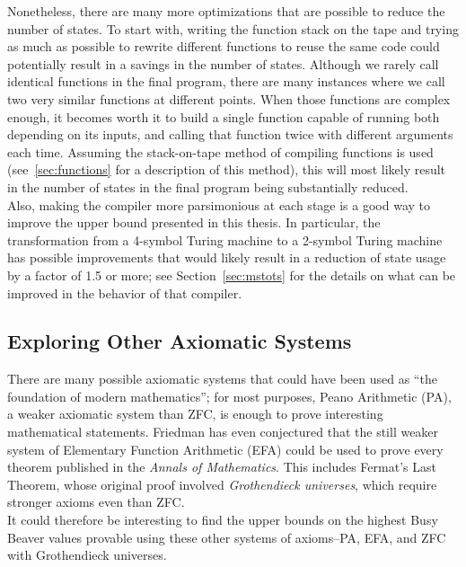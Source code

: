 \documentclass[11pt]{report}
\begin{document}
Nonetheless, there are many more optimizations that are possible to reduce the number of states. To start with, writing the function stack on the tape and trying as much as possible to rewrite different functions to reuse the same code could potentially result in a savings in the number of states. Although we rarely call identical functions in the final program, there are many instances where we call two very similar functions at different points. When those functions are complex enough, it becomes worth it to build a single function capable of running both depending on its inputs, and calling that function twice with different arguments each time. Assuming the stack-on-tape method of compiling functions is used (see~\ref{sec:functions} for a description of this method), this will most likely result in the number of states in the final program being substantially reduced. \\

Also, making the compiler more parsimonious at each stage is a good way to improve the upper bound presented in this thesis. In particular, the transformation from a 4-symbol Turing machine to a 2-symbol Turing machine has possible improvements that would likely result in a reduction of state usage by a factor of 1.5 or more; see Section~\ref{sec:mstots} for the details on what can be improved in the behavior of that compiler. \\

\subsection{Exploring Other Axiomatic Systems}

There are many possible axiomatic systems that could have been used as ``the foundation of modern mathematics''; for most purposes, Peano Arithmetic (PA), a weaker axiomatic system than ZFC, is enough to prove interesting mathematical statements. Friedman has even conjectured that the still weaker system of Elementary Function Arithmetic (EFA) could be used to prove every theorem published in the \emph{Annals of Mathematics}. %
This includes Fermat's Last Theorem, whose original proof involved \emph{Grothendieck universes}, which require stronger axioms even than ZFC.  \\ %

It could therefore be interesting to find the upper bounds on the highest Busy Beaver values provable using these other systems of axioms--PA, EFA, and ZFC with Grothendieck universes. \\
\end{document}

